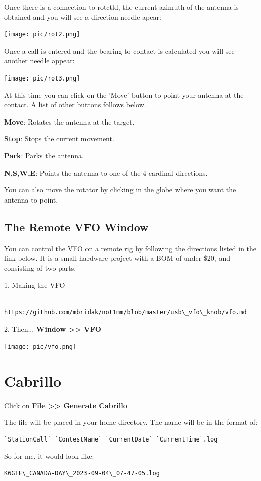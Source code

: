 \documentclass{article}
\begin{document}
Once there is a connection to rotctld, the current azimuth of the antenna is obtained and you will see a direction needle apear:

\vspace{0.5cm}
\texttt{[image: pic/rot2.png]}
\vspace{0.5cm}

Once a call is entered and the bearing to contact is calculated you will see another needle appear:

\vspace{0.5cm}
\texttt{[image: pic/rot3.png]}
\vspace{0.5cm}

At this time you can click on the 'Move' button to point your antenna at the contact. A list of other buttons follows below.

\textbf{Move}: Rotates the antenna at the target.

\textbf{Stop}: Stops the current movement.

\textbf{Park}: Parks the antenna.

\textbf{N,S,W,E}: Points the antenna to one of the 4 cardinal directions.

You can also move the rotator by clicking in the globe where you want the antenna to point.



\subsection{The Remote VFO Window}

You can control the VFO on a remote rig by following the directions listed in the link below. It is a small hardware project with a BOM of under \$20, and consisting of two parts.

1. Making the VFO
\begin{verbatim}
    https://github.com/mbridak/not1mm/blob/master/usb\_vfo\_knob/vfo.md
\end{verbatim}

2. Then... \textbf{Window >> VFO}

\vspace{0.5cm}
\texttt{[image: pic/vfo.png]}
\newpage
\section{Cabrillo}

Click on \textbf{File >> Generate Cabrillo}

The file will be placed in your home directory. The name will be in the format of:
\begin{verbatim}
`StationCall`_`ContestName`_`CurrentDate`_`CurrentTime`.log
\end{verbatim}
So for me, it would look like:
\begin{verbatim}
K6GTE\_CANADA-DAY\_2023-09-04\_07-47-05.log
\end{verbatim}
\end{document}
